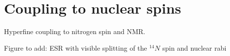 \section{Coupling to nuclear spins}

Hyperfine coupling to nitrogen spin and NMR.

Figure to add: ESR with visible splitting of the $^{14}N$ spin and nuclear rabi





\newpage




